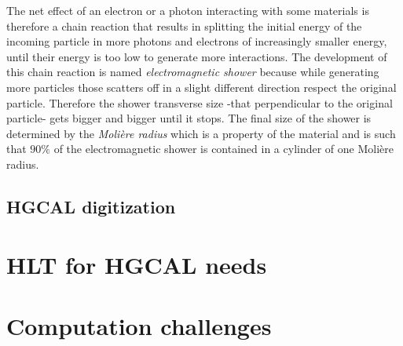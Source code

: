 The net effect of an electron or a photon interacting with some materials is therefore a chain reaction that results in splitting the initial energy of the incoming particle in more photons and electrons of increasingly smaller energy, until their energy is too low to generate more interactions.
The development of this chain reaction is named \textit{electromagnetic shower} because while generating more particles those scatters off in a slight different direction respect the original particle. Therefore the shower transverse size -that perpendicular to the original particle- gets bigger and bigger until it stops. The final size of the shower is determined by the \textit{Molière radius} which is a property of the material and is such that $90\%$ of the electromagnetic shower is contained in a cylinder of one Molière radius.

\subsection{HGCAL digitization}


\section{HLT for HGCAL needs}

\section{Computation challenges}
